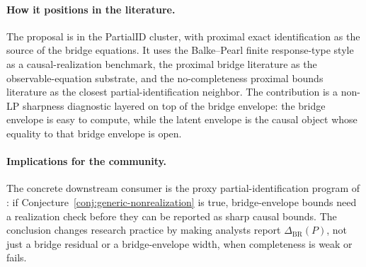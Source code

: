 \documentclass[11pt]{article}
\theoremstyle{definition}
\theoremstyle{plain}
\theoremstyle{remark}
\begin{document}
\paragraph{How it positions in the literature.}
The proposal is in the PartialID cluster, with proximal exact identification as
the source of the bridge equations.  It uses the Balke--Pearl finite
response-type style as a causal-realization benchmark, the proximal bridge
literature as the observable-equation substrate, and the no-completeness
proximal bounds literature as the closest partial-identification neighbor.  The
contribution is a non-LP sharpness diagnostic layered on top of the bridge
envelope: the bridge envelope is easy to compute, while the latent envelope is
the causal object whose equality to that bridge envelope is open.

\paragraph{Implications for the community.}
The concrete downstream consumer is the proxy partial-identification program of
\citet{GhassamiShpitserTchetgen2023}: if Conjecture~\ref{conj:generic-nonrealization}
is true, bridge-envelope bounds need a realization check before they can be
reported as sharp causal bounds.  The conclusion changes research practice by
making analysts report \(\Delta_{\mathrm{BR}}(P)\), not just a bridge residual
or a bridge-envelope width, when completeness is weak or fails.
\end{document}
